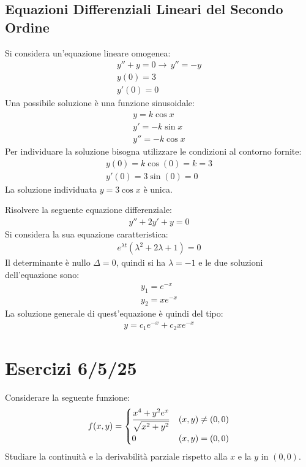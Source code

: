 \documentclass{article}
\numberwithin{equation}{subsection}
\begin{document}
\subsection{Equazioni Differenziali Lineari del Secondo Ordine}


Si considera un'equazione lineare omogenea:
\begin{gather*}
    y''+y=0\to\,y''=-y\\
    y(0)=3\\
    y'(0)=0
\end{gather*}
Una possibile soluzione è una funzione sinusoidale:
\begin{gather*}
    y=k\cos x\\
    y'=-k\sin x\\
    y''=-k\cos x
\end{gather*}
Per individuare la soluzione bisogna utilizzare le condizioni al contorno fornite:
\begin{gather*}
    y(0)=k\cos(0)=k=3\\
    y'(0)=3\sin(0)=0
\end{gather*}
La soluzione individuata $y=3\cos x$ è unica. 



Risolvere la seguente equazione differenziale:
\begin{gather*}
    y''+2y'+y=0
\end{gather*}
Si considera la sua equazione caratteristica:
\begin{gather*}
    e^{\lambda t}(\lambda^2+2\lambda+1)=0
\end{gather*}
Il determinante è nullo $\Delta=0$, quindi si ha $\lambda=-1$ e le due soluzioni dell'equazione sono:
\begin{gather*}
    y_1=e^{-x}\\
    y_2=xe^{-x}
\end{gather*}
La soluzione generale di quest'equazione è quindi del tipo:
\begin{gather*}
    y=c_1e^{-x}+c_2xe^{-x}
\end{gather*}

\clearpage

\section{Esercizi 6/5/25}

Considerare la seguente funzione:
\begin{gather*}
    f(x,y)=\begin{cases}
        \displaystyle\frac{\strut x^4+y^2e^x}{\strut\sqrt{x^2+y^2}}&(x,y)\neq(0,0)\\
        0&(x,y)=(0,0)
    \end{cases}
\end{gather*}
Studiare la continuità e la derivabilità parziale rispetto alla $x$ e la $y$ in $(0,0)$. 
\end{document}
